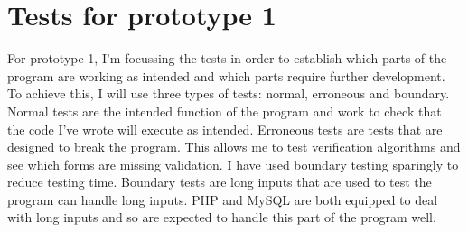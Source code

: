 \section{Tests for prototype 1}
For prototype 1, I’m focussing the tests in order to establish which parts of the program are working as intended and which parts require further development. To achieve this, I will use three types of tests: normal, erroneous and boundary. Normal tests are the intended function of the program and work to check that the code I’ve wrote will execute as intended. Erroneous tests are tests that are designed to break the program. This allows me to test verification algorithms and see which forms are missing validation. I have used boundary testing sparingly to reduce testing time. Boundary tests are long inputs that are used to test the program can handle long inputs. PHP and MySQL are both equipped to deal with long inputs and so are expected to handle this part of the program well. 
